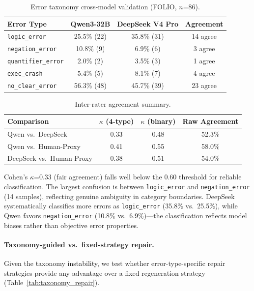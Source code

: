 \documentclass[11pt]{article}
\begin{document}
\begin{table}[t]
\centering
\caption{Error taxonomy cross-model validation (FOLIO, $n$=86).}
\label{tab:taxonomy}
\begin{tabular}{lccc}
\toprule
Error Type & Qwen3-32B & DeepSeek V4 Pro & Agreement \\
\midrule
\texttt{logic\_error}      & 25.5\% (22) & 35.8\% (31) & 14 agree \\
\texttt{negation\_error}   & 10.8\% (9)  & 6.9\% (6)   & 3 agree \\
\texttt{quantifier\_error} & 2.0\% (2)   & 3.5\% (3)   & 1 agree \\
\texttt{exec\_crash}       & 5.4\% (5)   & 8.1\% (7)   & 4 agree \\
\texttt{no\_clear\_error}  & 56.3\% (48) & 45.7\% (39) & 23 agree \\
\bottomrule
\end{tabular}
\end{table}

\begin{table}[t]
\centering
\caption{Inter-rater agreement summary.}
\label{tab:interrater}
\begin{tabular}{lccc}
\toprule
Comparison & $\kappa$ (4-type) & $\kappa$ (binary) & Raw Agreement \\
\midrule
Qwen vs.\ DeepSeek      & 0.33 & 0.48 & 52.3\% \\
Qwen vs.\ Human-Proxy   & 0.41 & 0.55 & 58.0\% \\
DeepSeek vs.\ Human-Proxy & 0.38 & 0.51 & 54.0\% \\
\bottomrule
\end{tabular}
\end{table}

Cohen's $\kappa$=0.33 (fair agreement) falls well below the 0.60 threshold for reliable classification. The largest confusion is between \texttt{logic\_error} and \texttt{negation\_error} (14 samples), reflecting genuine ambiguity in category boundaries. DeepSeek systematically classifies more errors as \texttt{logic\_error} (35.8\% vs.\ 25.5\%), while Qwen favors \texttt{negation\_error} (10.8\% vs.\ 6.9\%)---the classification reflects model biases rather than objective error properties.

\paragraph{Taxonomy-guided vs.\ fixed-strategy repair.} Given the taxonomy instability, we test whether error-type-specific repair strategies provide any advantage over a fixed regeneration strategy (Table~\ref{tab:taxonomy_repair}).
\end{document}
